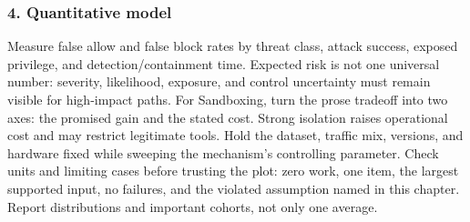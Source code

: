\subsubsection*{4. Quantitative model}
Measure false allow and false block rates by threat class, attack success, exposed privilege, and detection/containment time. Expected risk is not one universal number: severity, likelihood, exposure, and control uncertainty must remain visible for high-impact paths.
For Sandboxing, turn the prose tradeoff into two axes: the promised gain and the stated cost. Strong isolation raises operational cost and may restrict legitimate tools. Hold the dataset, traffic mix, versions, and hardware fixed while sweeping the mechanism's controlling parameter.
Check units and limiting cases before trusting the plot: zero work, one item, the largest supported input, no failures, and the violated assumption named in this chapter. Report distributions and important cohorts, not only one average.
